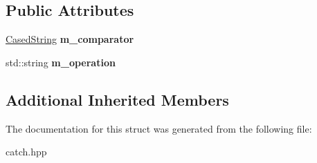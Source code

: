 \subsection*{Public Attributes}
\begin{DoxyCompactItemize}
\item 
\mbox{\label{structCatch_1_1Matchers_1_1StdString_1_1StringMatcherBase_a17c9f0fe40587070ffe998c193742831}} 
\hyperlink{structCatch_1_1Matchers_1_1StdString_1_1CasedString}{Cased\+String} {\bfseries m\+\_\+comparator}
\item 
\mbox{\label{structCatch_1_1Matchers_1_1StdString_1_1StringMatcherBase_a7a25c4b7d863e9a1c406d81efd0f83ca}} 
std\+::string {\bfseries m\+\_\+operation}
\end{DoxyCompactItemize}
\subsection*{Additional Inherited Members}


The documentation for this struct was generated from the following file\+:\begin{DoxyCompactItemize}
\item 
catch.\+hpp\end{DoxyCompactItemize}
